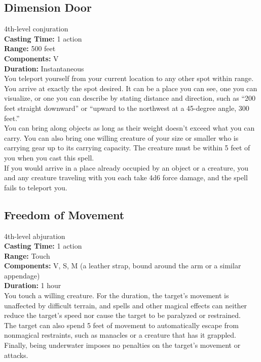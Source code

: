 \documentclass[11pt, A4paper, english]{article}
\begin{document}
		\subsection{Dimension Door}
4th-level conjuration \\
\textbf{Casting Time:} 1 action \\
\textbf{Range:} 500 feet \\
\textbf{Components:} V \\
\textbf{Duration:} Instantaneous \\
You teleport yourself from your current location to any other spot within range. You arrive at exactly the spot desired. It can be a place you can see, one you can visualize, or one you can describe by stating distance and direction, such as “200 feet straight downward” or “upward to the northwest at a 45-degree angle, 300 feet.” \\
You can bring along objects as long as their weight doesn’t exceed what you can carry. You can also bring one willing creature of your size or smaller who is carrying gear up to its carrying capacity. The creature must be within 5 feet of you when you cast this spell. \\
If you would arrive in a place already occupied by an object or a creature, you and any creature traveling with you each take 4d6 force damage, and the spell fails to teleport you.

		\subsection{Freedom of Movement}
4th-level abjuration \\
\textbf{Casting Time:} 1 action \\
\textbf{Range:} Touch \\
\textbf{Components:} V, S, M (a leather strap, bound around the arm or a similar appendage) \\
\textbf{Duration:} 1 hour \\
You touch a willing creature. For the duration, the target’s movement is unaffected by difficult terrain, and spells and other magical effects can neither reduce the target’s speed nor cause the target to be paralyzed or restrained. \\
The target can also spend 5 feet of movement to automatically escape from nonmagical restraints, such as manacles or a creature that has it grappled. Finally, being underwater imposes no penalties on the target's movement or attacks.
\end{document}
